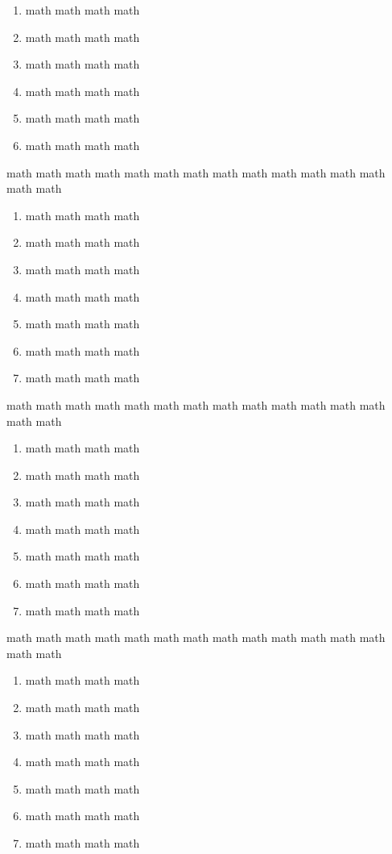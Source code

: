 \documentclass[12pt,a4paper]{article}
\begin{document}
\begin{multicols}{2}
\begin{Exercice}
\begin{enumerate}[label=\textbf{\color{gris}\arabic*.}]
    \item math math math math
    \item math math math math
    \item math math math math
    \item math math math math
    \item math math math math
    \item math math math math
\end{enumerate}
\end{Exercice}
\begin{Exercice}math math math math math math math math math math math math math math math
\begin{enumerate}[label=\textbf{\color{gris}\arabic*.}]
    \item math math math math
    \item math math math math
    \item math math math math
    \item math math math math
    \item math math math math
    \item math math math math
    \item math math math math
\end{enumerate}
\end{Exercice}
\begin{Exercice}math math math math math math math math math math math math math math math
\begin{enumerate}[label=\textbf{\color{gris}\arabic*.}]
    \item math math math math
    \item math math math math
    \item math math math math
    \item math math math math
    \item math math math math
    \item math math math math
    \item math math math math
\end{enumerate}
\end{Exercice}
\begin{Exercice}math math math math math math math math math math math math math math math
\begin{enumerate}[label=\textbf{\color{gris}\arabic*.}]
    \item math math math math
    \item math math math math
    \item math math math math
    \item math math math math
    \item math math math math
    \item math math math math
    \item math math math math
\end{enumerate}
\end{Exercice}
\end{multicols}
\end{document}
